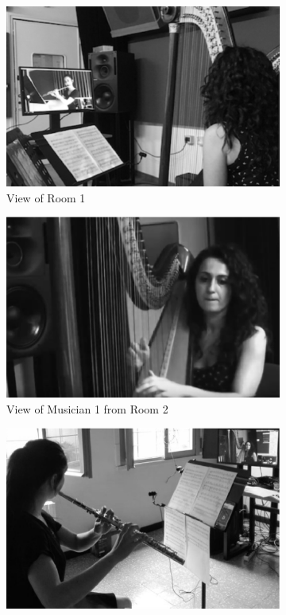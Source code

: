 \begin{figure}[t]
	\centering
    \begin{subfigure}[t]{.48\columnwidth}
		\centering        
		\includegraphics[width=\textwidth]{img/as.eps}
		\caption{View of Room 1}
		\label{subfig:as}
	\end{subfigure}
    \begin{subfigure}[t]{.48\columnwidth}
	\centering        
	\includegraphics[width=\textwidth]{img/av.eps}
	\caption{View of Musician 1 from Room 2}
	\label{subfig:av}
	\end{subfigure}
    \begin{subfigure}[t]{.48\columnwidth}
	\centering        
	\includegraphics[width=\textwidth]{img/fs.eps}

\end{subfigure}
\end{figure}
